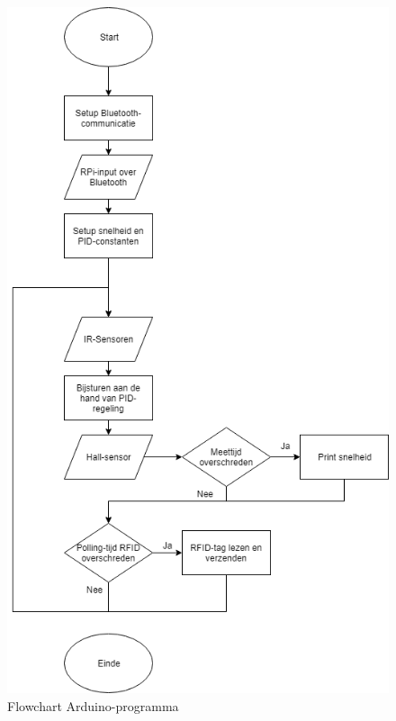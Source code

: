 \begin{figure}[H]
	\centering
	\includegraphics[height=\textheight]{arduinoflowchart.png}
	\caption{Flowchart Arduino-programma\label{fig:arduinoflowchart}}
	\end{figure}

